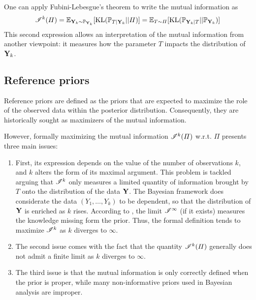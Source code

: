 One can apply Fubini-Lebesgue's theorem to write the mutual information as
\begin{equation}
    \mathscr{I}^k(\varPi) =  \mathbb{E}_{\mathbf{Y}_k\sim \mathbb{P}_{\mathbf{Y}_k}}[\text{KL}(\mathbb{P}_{T|\mathbf{Y}_k}||\varPi)] =  \mathbb{E}_{T\sim\varPi}[\text{KL}(\mathbb{P}_{\mathbf{Y}_k|T}||\mathbb{P}_{\mathbf{Y}_k}) ]
\end{equation}
This second expression allows an interpretation of the mutual information from another viewpoint: it measures how the parameter $T$ impacts the distribution of $\mathbf{Y}_k$.










\subsection{Reference priors}\label{sec:intro-ref:refpriors}

Reference priors are defined as the priors that are expected to maximize the role of the observed data within the posterior distribution.
Consequently, they are historically sought as maximizers of the mutual information.

However, formally maximizing the mutual information $\mathscr{I}^k(\varPi)$ w.r.t. $\varPi$ presents three main issues: %
\begin{enumerate}
    \item First, its expression depends on the value of the number of  observations $k$, and $k$ alters the form of its maximal argument. %
    This problem is tackled arguing that $\mathscr{I}^k$ only measures a limited quantity of information brought by $T$ onto the distribution of the data $\mathbf{Y}$. The Bayesian framework does considerate the data $(Y_1,\dots,Y_k)$ to be dependent, so that the distribution of $\mathbf{Y}$ is enriched as $k$ rises.
    According to \citet{bernardo_bayesian_1994}, the limit $\mathscr{I}^\infty$ (if it exists) measures the knowledge missing form the prior.
    Thus, the formal definition tends to maximize $\mathscr{I}^k$ as $k$ diverges to $\infty$.
    \item The second issue comes with the fact that the quantity $\mathscr{I}^k(\varPi)$ generally does not admit a finite limit as $k$ diverges to $\infty$.
    \item The third issue is that the mutual information is only correctly defined when the prior is proper, while many non-informative priors used in Bayesian analysis are improper.
\end{enumerate}

